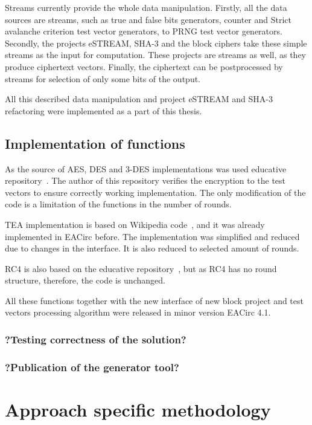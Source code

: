\documentclass[
  print, %
  Table,   %
  nolof,     %
  nolot,     %
  11pt, %
  oneside  %
]{fithesis3}
\begin{document}
Streams currently provide the whole data manipulation. Firstly, all the data sources are streams, such as true and false bits generators, counter and Strict avalanche criterion test vector generators, to PRNG test vector generators. Secondly, the projects eSTREAM, SHA-3 and the block ciphers take these simple streams as the input for computation. These projects are streams as well, as they produce ciphertext vectors. Finally, the ciphertext can be postprocessed by streams for selection of only some bits of the output.

All this described data manipulation and project eSTREAM and SHA-3 refactoring were implemented as a part of this thesis.

\subsection{Implementation of functions}

As the source of AES, DES and 3-DES implementations was used educative repository~\cite{cryptoFunc}. The author of this repository verifies the encryption to the test vectors to ensure correctly working implementation. The only modification of the code is a limitation of the functions in the number of rounds.

TEA implementation is based on Wikipedia code~\cite{teaWiki}, and it was already implemented in EACirc before. The implementation was simplified and reduced due to changes in the interface. It is also reduced to selected amount of rounds.

RC4 is also based on the educative repository~\cite{cryptoFunc}, but as RC4 has no round structure, therefore, the code is unchanged.

All these functions together with the new interface of new block project and test vectors processing algorithm were released in minor version EACirc 4.1.

\subsubsection{?Testing correctness of the solution?}
\subsubsection{?Publication of the generator tool?}


\section{Approach specific methodology}
\end{document}
